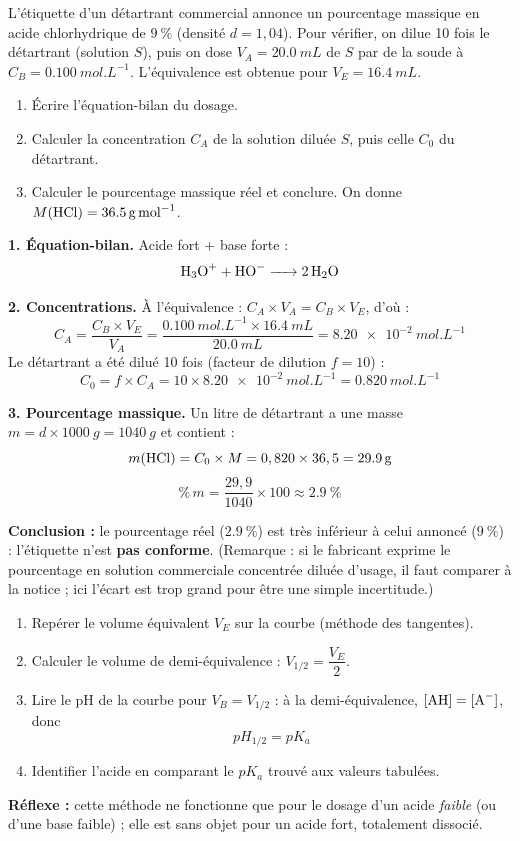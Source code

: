 \documentclass[11pt]{article}
\newcommand{\cle}[1]{{\popxbold\color{popdark}#1}}
\begin{document}
\begin{exoresolu}
L'étiquette d'un détartrant commercial annonce un pourcentage massique en acide chlorhydrique de $\SI{9}{\percent}$ (densité $d = 1,04$). Pour vérifier, on dilue 10 fois le détartrant (solution $S$), puis on dose $V_A = \SI{20,0}{mL}$ de $S$ par de la soude à $C_B = \SI{0,100}{mol.L^{-1}}$. L'équivalence est obtenue pour $V_E = \SI{16,4}{mL}$.
\begin{enumerate}
\item Écrire l'équation-bilan du dosage.
\item Calculer la concentration $C_A$ de la solution diluée $S$, puis celle $C_0$ du détartrant.
\item Calculer le pourcentage massique réel et conclure. On donne $M(\ce{HCl}) = \SI{36,5}{g.mol^{-1}}$.
\end{enumerate}
\tcblower
\textbf{1. Équation-bilan.} Acide fort + base forte :
\[ \ce{H3O+ + HO- -> 2 H2O} \]

\textbf{2. Concentrations.} À l'équivalence : $C_A \times V_A = C_B \times V_E$, d'où :
\[ C_A = \frac{C_B \times V_E}{V_A} = \frac{\SI{0,100}{mol.L^{-1}} \times \SI{16,4}{mL}}{\SI{20,0}{mL}} = \SI{8,20e-2}{mol.L^{-1}} \]
Le détartrant a été dilué 10 fois (facteur de dilution $f = 10$) :
\[ C_0 = f \times C_A = 10 \times \SI{8,20e-2}{mol.L^{-1}} = \SI{0,820}{mol.L^{-1}} \]

\textbf{3. Pourcentage massique.} Un litre de détartrant a une masse $m = d \times \SI{1000}{g} = \SI{1040}{g}$ et contient :
\[ m(\ce{HCl}) = C_0 \times M = 0,820 \times 36,5 = \SI{29,9}{g} \]
\[ \%\,m = \frac{29,9}{1040} \times 100 \approx \SI{2,9}{\percent} \]

\textbf{Conclusion :} le pourcentage réel ($\SI{2,9}{\percent}$) est très inférieur à celui annoncé ($\SI{9}{\percent}$) : l'étiquette n'est \textbf{pas conforme}. (Remarque : si le fabricant exprime le pourcentage en solution commerciale concentrée diluée d'usage, il faut comparer à la notice ; ici l'écart est trop grand pour être une simple incertitude.)
\end{exoresolu}

\begin{methode}
\begin{enumerate}
\item \cle{Repérer} le volume équivalent $V_E$ sur la courbe (méthode des tangentes).
\item \cle{Calculer} le volume de demi-équivalence : $V_{1/2} = \dfrac{V_E}{2}$.
\item \cle{Lire} le pH de la courbe pour $V_B = V_{1/2}$ : à la demi-équivalence, $[\ce{AH}] = [\ce{A-}]$, donc
\[ pH_{1/2} = pK_a \]
\item \cle{Identifier} l'acide en comparant le $pK_a$ trouvé aux valeurs tabulées.
\end{enumerate}
\textbf{Réflexe :} cette méthode ne fonctionne que pour le dosage d'un acide \emph{faible} (ou d'une base faible) ; elle est sans objet pour un acide fort, totalement dissocié.
\end{methode}
\end{document}
